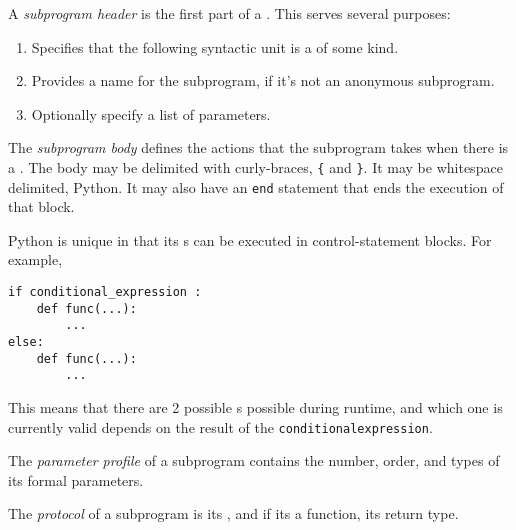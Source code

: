 \begin{definition}\label{def:Subprogram_Header}
  A \emph{subprogram header} is the first part of a .
  This serves several purposes:
  \begin{enumerate}[noitemsep]
  \item Specifies that the following syntactic unit is a  of some kind.
  \item Provides a name for the subprogram, if it's not an anonymous subprogram.
  \item Optionally specify a list of parameters.
  \end{enumerate}
\end{definition}

\begin{definition}\label{def:Subprogram_Body}
  The \emph{subprogram body} defines the actions that the subprogram takes when there is a .
  The body may be delimited with curly-braces, \texttt{\{} and \texttt{\}}.
  It may be whitespace delimited, Python.
  It may also have an \texttt{end} statement that ends the execution of that block.
\end{definition}

Python is unique in that its s can be executed in control-statement blocks.
For example,
\begin{verbatim}
if conditional_expression :
    def func(...):
        ...
else:
    def func(...):
        ...
\end{verbatim}
This means that there are 2 possible s possible during runtime, and which one is currently valid depends on the result of the \texttt{conditional\textunderscore{}expression}.

\begin{definition}\label{def:Subprogram_Parameter_Profile}
  The \emph{parameter profile} of a subprogram contains the number, order, and types of its formal parameters.
\end{definition}

\begin{definition}[Protocol]\label{def:Subprogram_Protocol}
  The \emph{protocol} of a subprogram is its , and if its a function, its return type.
\end{definition}

